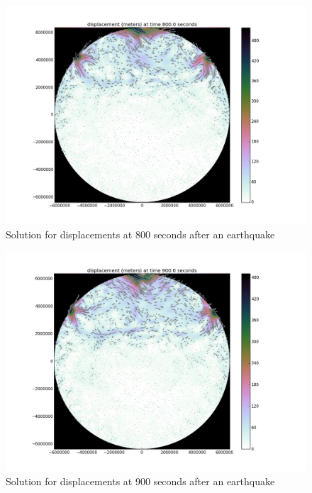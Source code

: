 \documentclass[12pt]{article}
\begin{document}
\begin{figure}
\includegraphics[scale=0.4]{figures/800s}
\centering
\caption{Solution for displacements at 800 seconds after an earthquake}
\end{figure}

\begin{figure}
\includegraphics[scale=0.4]{figures/900s}
\centering
\caption{Solution for displacements at 900 seconds after an earthquake}
\end{figure}
\end{document}
